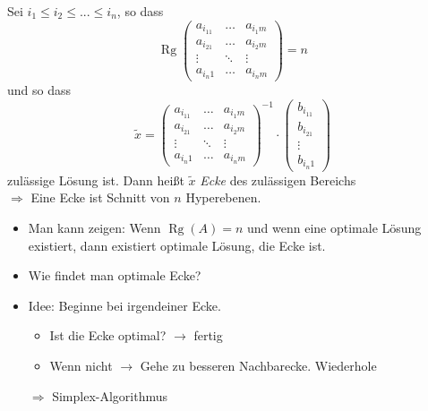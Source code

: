 \Defi Sei $i_1 \leq i_2 \leq ... \leq i_n$, so dass
\[\operatorname{Rg}\begin{pmatrix}
                    a_{i_11} & \hdots & a_{i_1m} \\
                    a_{i_21} & \hdots & a_{i_2m} \\
                    \vdots & \ddots & \vdots \\
                    a_{i_n1} & \hdots & a_{i_nm}
                   \end{pmatrix} = n
\]
und so dass
\[ \tilde x = \begin{pmatrix}
                    a_{i_11} & \hdots & a_{i_1m} \\
                    a_{i_21} & \hdots & a_{i_2m} \\
                    \vdots & \ddots & \vdots \\
                    a_{i_n1} & \hdots & a_{i_nm}
                   \end{pmatrix}^{-1} \cdot \begin{pmatrix}
                    b_{i_11} \\
                    b_{i_21} \\
                    \vdots \\
                    b_{i_n1} 
                   \end{pmatrix}\]
zulässige Lösung ist. Dann heißt $\tilde x$ \emph{Ecke} des zulässigen Bereichs \\
$\Rightarrow$ Eine Ecke ist Schnitt von $n$ Hyperebenen.
\begin{itemize}
 \item Man kann zeigen: Wenn $\operatorname{Rg}(A) = n$ und wenn eine optimale Lösung existiert, dann existiert optimale Lösung, die Ecke ist.
 \item Wie findet man optimale Ecke?
 \item Idee: Beginne bei irgendeiner Ecke.
     \begin{itemize}
      \item Ist die Ecke optimal? $\rightarrow$ fertig
      \item Wenn nicht $\rightarrow$ Gehe zu besseren Nachbarecke. Wiederhole
     \end{itemize}
     $\Rightarrow$ Simplex-Algorithmus
\end{itemize}

